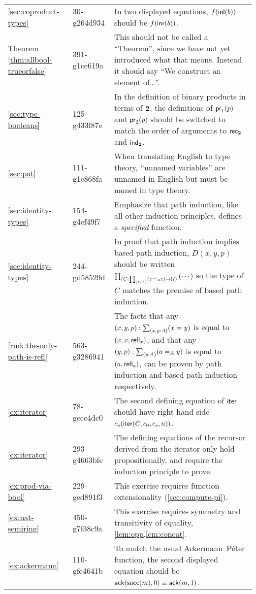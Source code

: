 \documentclass[
%
%
11pt %
]{article}
\begin{document}
\begin{longtable}{llp{10.5cm}}
  \cref{sec:coproduct-types}
  & 30-g264d934
  & In two displayed equations, $f({\mathsf{inl}}(b))$ should be $f({\mathsf{inr}}(b))$.\\
  Theorem \ref{thm:allbool-trueorfalse}
  & 391-g1ce619a
  & This should not be called a ``Theorem'', since we have not yet introduced what that means.
  Instead it should say ``We construct an element of\dots''.\\
  \cref{sec:type-booleans}
  & 125-g433f87e
  & In the definition of binary products in terms of $\mathbf{2}$, the definitions of $\mathsf{pr}_{1}(p)$ and $\mathsf{pr}_{2}(p)$ should be switched to match the order of arguments to $\mathsf{rec}_{\mathbf{2}}$ and $\mathsf{ind}_{\mathbf{2}}$.\\
  \cref{sec:pat}
  & 111-g1e868fa
  & When translating English to type theory, ``unnamed variables'' are unnamed in English but must be named in type theory.\\
  \cref{sec:identity-types}
  & 154-g4ef49f7
  & Emphasize that path induction, like all other induction principles, defines a \emph{specified} function.\\
  \cref{sec:identity-types}
  & 244-gd58529d
  & In proof that path induction implies based path induction, $D(x,y,p)$ should be written $\prd{C : \prd{z:A} (\id[A]{x}{z}) \to \UU} \left( \cdots \right)$ so the type of $C$ matches the premise of based path induction. \\
  \cref{rmk:the-only-path-is-refl}
  & 563-g3286941
  & The facts that any $(x,y,p): \sm{x,y:A}(\id{x}{y})$ is equal to $(x,x,\mathsf{refl}_{x})$, and that any $(y,p):\sm{y:A}(\id[A]{a}{y})$ is equal to $(a,\mathsf{refl}_{a})$, can be proven by path induction and based path induction respectively.\\
  \cref{ex:iterator}
  & 78-gcce4dc0
  & The second defining equation of $\mathsf{iter}$ should have right-hand side $c_s(\mathsf{iter}(C,c_0,c_s,n))$.\\
  \cref{ex:iterator}
  & 293-g4663bfe
  & The defining equations of the recursor derived from the iterator only hold propositionally, and require the induction principle to prove.\\
  \cref{ex:prod-via-bool}
  & 229-ged891f3
  & This exercise requires function extensionality (\cref{sec:compute-pi}).\\
  \cref{ex:nat-semiring}
  & 450-g7f38c9a
  & This exercise requires symmetry and transitivity of equality, \cref{lem:opp,lem:concat}.\\
  \cref{ex:ackermann}
  & 110-gfe4641b
  & To match the usual Ackermann--P\'eter function, the second displayed equation should be $\mathsf{ack}(\mathsf{succ}(m),0) \equiv \mathsf{ack}(m,1)$.\\

\end{longtable}
\end{document}
